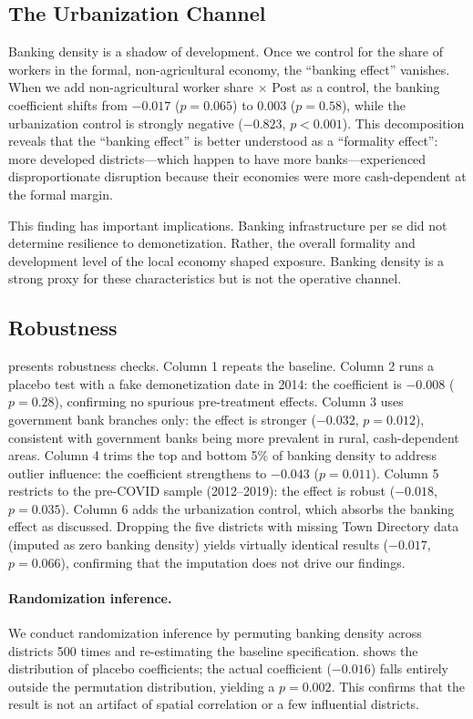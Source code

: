 \documentclass[12pt]{article}
\begin{document}
\subsection{The Urbanization Channel}

Banking density is a shadow of development. Once we control for the share of workers in the formal, non-agricultural economy, the ``banking effect'' vanishes. When we add non-agricultural worker share $\times$ Post as a control, the banking coefficient shifts from $-0.017$ ($p = 0.065$) to $0.003$ ($p = 0.58$), while the urbanization control is strongly negative ($-0.823$, $p < 0.001$). This decomposition reveals that the ``banking effect'' is better understood as a ``formality effect'': more developed districts---which happen to have more banks---experienced disproportionate disruption because their economies were more cash-dependent at the formal margin.

This finding has important implications. Banking infrastructure per se did not determine resilience to demonetization. Rather, the overall formality and development level of the local economy shaped exposure. Banking density is a strong proxy for these characteristics but is not the operative channel.

\subsection{Robustness}

 presents robustness checks. Column 1 repeats the baseline. Column 2 runs a placebo test with a fake demonetization date in 2014: the coefficient is $-0.008$ ($p = 0.28$), confirming no spurious pre-treatment effects. Column 3 uses government bank branches only: the effect is stronger ($-0.032$, $p = 0.012$), consistent with government banks being more prevalent in rural, cash-dependent areas. Column 4 trims the top and bottom 5\% of banking density to address outlier influence: the coefficient strengthens to $-0.043$ ($p = 0.011$). Column 5 restricts to the pre-COVID sample (2012--2019): the effect is robust ($-0.018$, $p = 0.035$). Column 6 adds the urbanization control, which absorbs the banking effect as discussed. Dropping the five districts with missing Town Directory data (imputed as zero banking density) yields virtually identical results ($-0.017$, $p = 0.066$), confirming that the imputation does not drive our findings.



\paragraph{Randomization inference.} We conduct randomization inference by permuting banking density across districts 500 times and re-estimating the baseline specification.  shows the distribution of placebo coefficients; the actual coefficient ($-0.016$) falls entirely outside the permutation distribution, yielding a $p = 0.002$. This confirms that the result is not an artifact of spatial correlation or a few influential districts.
\end{document}
